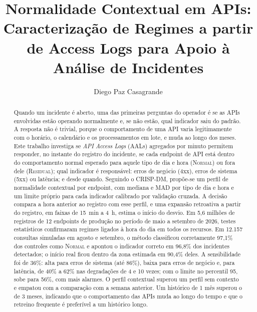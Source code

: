 \documentclass[sigconf,nonacm]{acmart}
\newcommand{\Normal}{\textsc{Normal}\xspace}
\newcommand{\Residual}{\textsc{Residual}\xspace}
\begin{document}
\title{Normalidade Contextual em APIs: Caracterização de Regimes a partir de Access Logs para Apoio à Análise de Incidentes}

\author{Diego Paz Casagrande}

\renewcommand{\shortauthors}{D. P. Casagrande}

\begin{abstract}
Quando um incidente é aberto, uma das primeiras perguntas do operador é se as APIs envolvidas estão operando normalmente e, se não estão, qual indicador saiu do padrão. A resposta não é trivial, porque o comportamento de uma API varia legitimamente com o horário, o calendário e os processamentos em lote, e muda ao longo dos meses. Este trabalho investiga se \emph{API Access Logs} (AALs) agregados por minuto permitem responder, no instante do registro do incidente, se cada endpoint de API está dentro do comportamento normal esperado para aquele tipo de dia e hora (\Normal) ou fora dele (\Residual); qual indicador é responsável: erros de negócio (4xx), erros de sistema (5xx) ou latência; e desde quando. Seguindo o CRISP-DM, propõe-se um perfil de normalidade contextual por endpoint, com mediana e MAD por tipo de dia e hora e um limite próprio para cada indicador calibrado por validação cruzada. A decisão compara a hora anterior ao registro com esse perfil, e uma expansão retroativa a partir do registro, em faixas de 15~min a 4~h, estima o início do desvio. Em 5,6 milhões de registros de 12 endpoints de produção no período de maio a setembro de 2026, testes estatísticos confirmaram regimes ligados à hora do dia em todos os recursos. Em 12.157 consultas simuladas em agosto e setembro, o método classificou corretamente 97,1\% dos controles como \Normal e apontou o indicador correto em 96,8\% dos incidentes detectados; o início real ficou dentro da zona estimada em 90,4\% deles. A sensibilidade foi de 36\%: alta para erros de sistema (até 86\%), baixa para erros de negócio e, para latência, de 40\% a 62\% nas degradações de 4 e 10 vezes; com o limite no percentil 95, sobe para 56\%, com mais alarmes. O perfil contextual superou um perfil sem contexto e empatou com a comparação com a semana anterior. Um histórico de 1 mês superou o de 3 meses, indicando que o comportamento das APIs muda ao longo do tempo e que o retreino frequente é preferível a um histórico longo.
\end{abstract}

\end{document}
